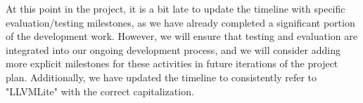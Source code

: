 {
  At this point in the project, it is a bit late to update the timeline with specific evaluation/testing milestones, as we have already completed a significant portion of the development work. However, we will ensure that testing and evaluation are integrated into our ongoing development process, and we will consider adding more explicit milestones for these activities in future iterations of the project plan. Additionally, we have updated the timeline to consistently refer to "LLVMLite" with the correct capitalization.
}

{}
